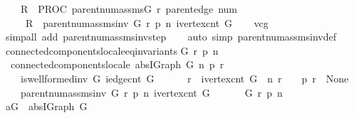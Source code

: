 \begin{isabellebody}
\ \ \ \ {\isasymacute}R\ {\isacharcolon}{\isacharequal}{\isacharequal}\ PROC\ parent{\isacharunderscore}num{\isacharunderscore}assms{\isacharparenleft}{\isasymacute}G{\isacharcomma}\ {\isasymacute}r{\isacharcomma}\ {\isasymacute}parent{\isacharunderscore}edge{\isacharcomma}\ {\isasymacute}num{\isacharparenright}\isanewline
\ \ \ \ {\isasymlbrace}\ {\isasymacute}R\ {\isacharequal}\ parent{\isacharunderscore}num{\isacharunderscore}assms{\isacharunderscore}inv\ G\ r\ p\ n\ {\isacharparenleft}ivertex{\isacharunderscore}cnt\ G{\isacharparenright}{\isasymrbrace}{\isachardoublequoteclose}\isanewline
%
\isadelimproof
\ \ %
\endisadelimproof
%
\isatagproof
{}\isamarkupfalse%
\ vcg\isanewline
\ \ \isamarkupfalse%
\ {\isacharparenleft}simp{\isacharunderscore}all\ add{\isacharcolon}\ parent{\isacharunderscore}num{\isacharunderscore}assms{\isacharunderscore}inv{\isacharunderscore}step{\isacharparenright}\isanewline
\ \ \isamarkupfalse%
\ {\isacharparenleft}auto\ simp{\isacharcolon}\ parent{\isacharunderscore}num{\isacharunderscore}assms{\isacharunderscore}inv{\isacharunderscore}def{\isacharparenright}\isanewline
\ \ \isamarkupfalse%
%
\endisatagproof
{\isafoldproof}%
%
\isadelimproof
\isanewline
%
\endisadelimproof
\isanewline
{}\isamarkupfalse%
\ connected{\isacharunderscore}components{\isacharunderscore}locale{\isacharunderscore}eq{\isacharunderscore}invariants{\isacharcolon}\isanewline
{\isachardoublequoteopen}{\isasymAnd}G\ r\ p\ n{\isachardot}\ \isanewline
\ \ connected{\isacharunderscore}components{\isacharunderscore}locale\ {\isacharparenleft}abs{\isacharunderscore}IGraph\ G{\isacharparenright}\ n\ p\ r\ {\isacharequal}\ \isanewline
\ \ \ \ {\isacharparenleft}is{\isacharunderscore}wellformed{\isacharunderscore}inv\ G\ {\isacharparenleft}iedge{\isacharunderscore}cnt\ G{\isacharparenright}\ {\isasymand}\ \isanewline
\ \ \ \ r\ {\isacharless}\ ivertex{\isacharunderscore}cnt\ G\ {\isasymand}\ n\ r\ {\isacharequal}\ {}\ {\isasymand}\ p\ r\ {\isacharequal}\ None\ {\isasymand}\ \isanewline
\ \ \ \ parent{\isacharunderscore}num{\isacharunderscore}assms{\isacharunderscore}inv\ G\ r\ p\ n\ {\isacharparenleft}ivertex{\isacharunderscore}cnt\ G{\isacharparenright}{\isacharparenright}{\isachardoublequoteclose}\ \isanewline
%
\isadelimproof
%
\endisadelimproof
%
\isatagproof
{}\isamarkupfalse%
\ {\isacharminus}\isanewline
\ \ \isamarkupfalse%
\ G\ r\ p\ n\isanewline
\ \ \isamarkupfalse%
\ {\isacharquery}aG\ {\isacharequal}\ {\isachardoublequoteopen}abs{\isacharunderscore}IGraph\ G{\isachardoublequoteclose}\isanewline

\end{isabellebody}
